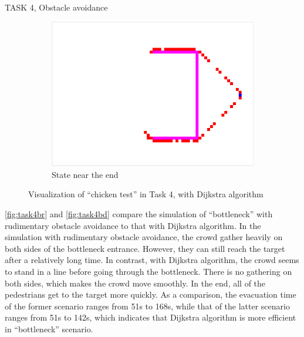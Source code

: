 \documentclass[10pt,a4paper]{article}
\begin{document}
\begin{task}{TASK 4, Obstacle avoidance}
\begin{figure}[htbp]
\begin{subfigure}[b]{0.31\textwidth}
    \includegraphics[width=\textwidth]{pictures/Task4_end_cd.png}
    \caption{State near the end}
    \label{fig:Task4_end_cd}
  \end{subfigure}
  \caption{Visualization of ``chicken test'' in Task 4, with Dijkstra algorithm}
  \label{fig:task4cd}
\end{figure}

\autoref{fig:task4br} and \autoref{fig:task4bd} compare the simulation of ``bottleneck'' with rudimentary obstacle avoidance to that with Dijkstra algorithm. In the simulation with rudimentary obstacle avoidance, the crowd gather heavily on both sides of the bottleneck entrance. However, they can still reach the target after a relatively long time. In contrast, with Dijkstra algorithm, the crowd seems to stand in a line before going through the bottleneck. There is no gathering on both sides, which makes the crowd move smoothly. In the end, all of the pedestrians get to the target more quickly. As a comparison, the evacuation time of the former scenario ranges from 51s to 168s, while that of the latter scenario ranges from 51s to 142s, which indicates that Dijkstra algorithm is more efficient in ``bottleneck'' scenario.


\end{task}
\end{document}
